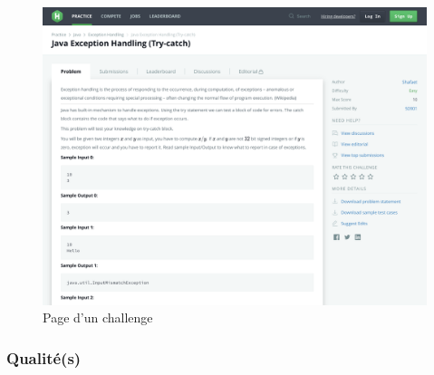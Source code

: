 \begin{figure}[H]
    \includegraphics[width=\textwidth,height=0.35\textheight,keepaspectratio]{images/comparison/hacker-3.png}
    \centering
    \caption[Hackerrank : page d'un challenge]{Page d'un challenge}
\end{figure}

\subsubsection*{Qualité(s)}

